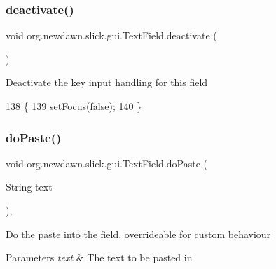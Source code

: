 \subsubsection{\texorpdfstring{deactivate()}{deactivate()}}
{\footnotesize\ttfamily void org.\+newdawn.\+slick.\+gui.\+Text\+Field.\+deactivate (\begin{DoxyParamCaption}{ }\end{DoxyParamCaption})\hspace{0.3cm}{\ttfamily [inline]}}

Deactivate the key input handling for this field 
\begin{DoxyCode}
138                              \{
139         \mbox{\hyperlink{classorg_1_1newdawn_1_1slick_1_1gui_1_1_text_field_afc1eb9faa443f02ad96712a334989ad2}{setFocus}}(\textcolor{keyword}{false});
140     \}
\end{DoxyCode}
\mbox{\label{classorg_1_1newdawn_1_1slick_1_1gui_1_1_text_field_a372f3a93f21b6b105617951d35307aa9}} 
\subsubsection{\texorpdfstring{do\+Paste()}{doPaste()}}
{\footnotesize\ttfamily void org.\+newdawn.\+slick.\+gui.\+Text\+Field.\+do\+Paste (\begin{DoxyParamCaption}\item[{String}]{text }\end{DoxyParamCaption})\hspace{0.3cm}{\ttfamily [inline]}, {\ttfamily [protected]}}

Do the paste into the field, overrideable for custom behaviour


\begin{DoxyParams}{Parameters}
{\em text} & The text to be pasted in \\
\hline
\end{DoxyParams}

